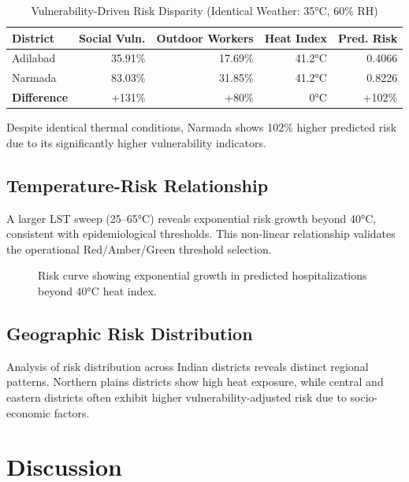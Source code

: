 \documentclass[conference]{IEEEtran}
\begin{document}
\begin{table}[htbp]
\centering
\caption{Vulnerability-Driven Risk Disparity (Identical Weather: 35°C, 60\% RH)}
\begin{tabular}{@{}lrrrr@{}}
\toprule
\textbf{District} & \textbf{Social Vuln.} & \textbf{Outdoor Workers} & \textbf{Heat Index} & \textbf{Pred. Risk} \\
\midrule
Adilabad & 35.91\% & 17.69\% & 41.2°C & 0.4066 \\
Narmada & 83.03\% & 31.85\% & 41.2°C & 0.8226 \\
\midrule
\textbf{Difference} & +131\% & +80\% & 0°C & +102\% \\
\bottomrule
\end{tabular}
\label{tab:district_compare}
\end{table}

Despite identical thermal conditions, Narmada shows 102\% higher predicted risk due to its significantly higher vulnerability indicators.

\subsection{Temperature-Risk Relationship}
A larger LST sweep (25--65°C) reveals exponential risk growth beyond 40°C, consistent with epidemiological thresholds. This non-linear relationship validates the operational Red/Amber/Green threshold selection.

\begin{figure}[htbp]
    \centering
    \fbox{\rule{0pt}{1.6in}\rule{0.9\linewidth}{0pt}}
    \caption{Risk curve showing exponential growth in predicted hospitalizations beyond 40°C heat index.}
    \label{fig:riskcurve}
\end{figure}

\subsection{Geographic Risk Distribution}
Analysis of risk distribution across Indian districts reveals distinct regional patterns. Northern plains districts show high heat exposure, while central and eastern districts often exhibit higher vulnerability-adjusted risk due to socio-economic factors.

\section{Discussion}
\label{sec:discussion}
\end{document}
